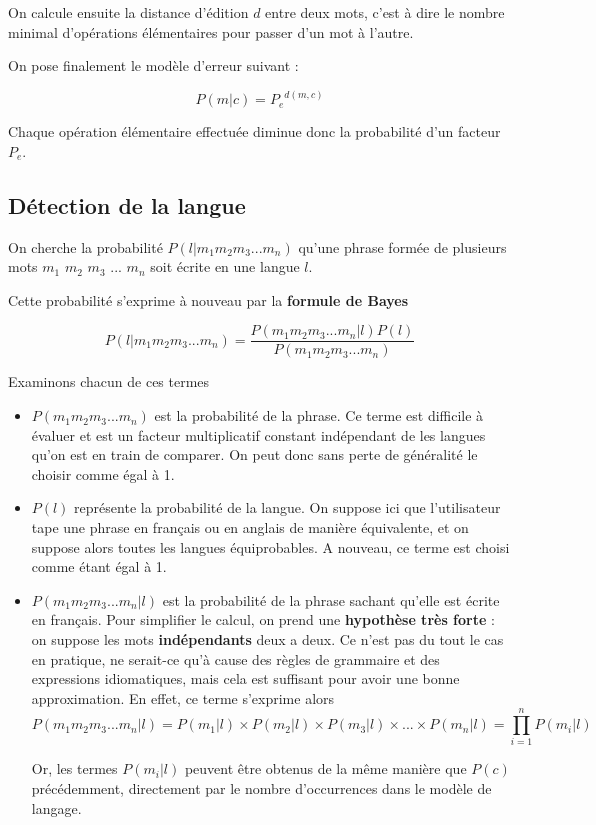 \documentclass[10pt,a4paper]{article}
\begin{document}
On calcule ensuite la distance d'édition $d$ entre deux mots, c'est à dire le nombre minimal d'opérations élémentaires pour passer d'un mot à l'autre.

On pose finalement le modèle d'erreur suivant : 

\begin{equation}
P(m|c) = {P_e}^{d(m,c)}
\end{equation}

Chaque opération élémentaire effectuée diminue donc la probabilité d'un facteur $P_e$.

\subsection{Détection de la langue}

On cherche la probabilité $P(l|m_1m_2m_3...m_n)$ qu'une phrase formée de plusieurs mots $m_1$ $m_2$ $m_3$ ... $m_n$ soit écrite en une langue $l$.
 
 Cette probabilité s'exprime à nouveau par la \textbf{formule de Bayes}

 \begin{equation}
 P(l|m_1m_2m_3...m_n) = \frac{P(m_1m_2m_3...m_n|l)P(l)}{P(m_1m_2m_3...m_n)}
 \end{equation}
 
 Examinons chacun de ces termes
 
 \begin{itemize}
 \item $P(m_1m_2m_3...m_n)$ est la probabilité de la phrase. Ce terme est difficile à évaluer et est un facteur multiplicatif constant indépendant de les langues qu'on est en train de comparer. On peut donc sans perte de généralité le choisir comme égal à 1.
 \item $P(l)$ représente la probabilité de la langue. On suppose ici que l'utilisateur tape une phrase en français ou en anglais de manière équivalente, et on suppose alors toutes les langues équiprobables. A nouveau, ce terme est choisi comme étant égal à 1.
 \item $P(m_1m_2m_3...m_n|l)$ est la probabilité de la phrase sachant qu'elle est écrite en français. Pour simplifier le calcul, on prend une \textbf{hypothèse très forte} : on suppose les mots \textbf{indépendants} deux a deux. Ce n'est pas du tout le cas en pratique, ne serait-ce qu'à cause des règles de grammaire et des expressions idiomatiques, mais cela est suffisant pour avoir une bonne approximation. En effet, ce terme s'exprime alors 
\begin{equation}
P(m_1m_2m_3...m_n|l) = P(m_1|l) \times P(m_2|l) \times P(m_3|l) \times ... \times P(m_n|l) = \prod_{i=1}^nP(m_i|l)
\end{equation}

Or, les termes $P(m_i|l)$ peuvent être obtenus de la même manière que $P(c)$ précédemment, directement par le nombre d'occurrences dans le modèle de langage.\\
 \end{itemize}
 
\end{document}
